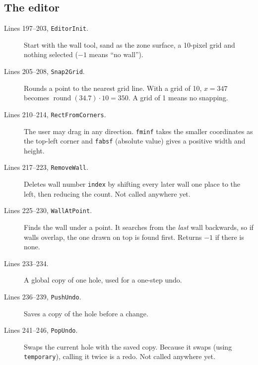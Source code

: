 \documentclass[11pt,a4paper]{article}
\newcommand{\code}[3]{}
\begin{document}
\subsection{The editor}

\code{level.c}{195}{246}

\begin{description}
  \item[Lines 197--203, \texttt{EditorInit}.] Start with the wall tool, sand as the zone surface, a 10-pixel grid and
  nothing selected ($-1$ means ``no wall'').
  \item[Lines 205--208, \texttt{Snap2Grid}.] Rounds a point to the nearest grid line. With a grid of 10,
  $x = 347$ becomes $\operatorname{round}(34.7)\cdot 10 = 350$. A grid of 1 means no snapping.
  \item[Lines 210--214, \texttt{RectFromCorners}.] The user may drag in any direction. \texttt{fminf} takes the
  smaller coordinates as the top-left corner and \texttt{fabsf} (absolute value) gives a positive width and height.
  \item[Lines 217--223, \texttt{RemoveWall}.] Deletes wall number \texttt{index} by shifting every later wall one place
  to the left, then reducing the count. Not called anywhere yet.
  \item[Lines 225--230, \texttt{WallAtPoint}.] Finds the wall under a point. It searches from the \emph{last} wall
  backwards, so if walls overlap, the one drawn on top is found first. Returns $-1$ if there is none.
  \item[Lines 233--234.] A global copy of one hole, used for a one-step undo.
  \item[Lines 236--239, \texttt{PushUndo}.] Saves a copy of the hole before a change.
  \item[Lines 241--246, \texttt{PopUndo}.] Swaps the current hole with the saved copy. Because it swaps (using
  \texttt{temporary}), calling it twice is a redo. Not called anywhere yet.
\end{description}

\code{level.c}{248}{313}
\end{document}
